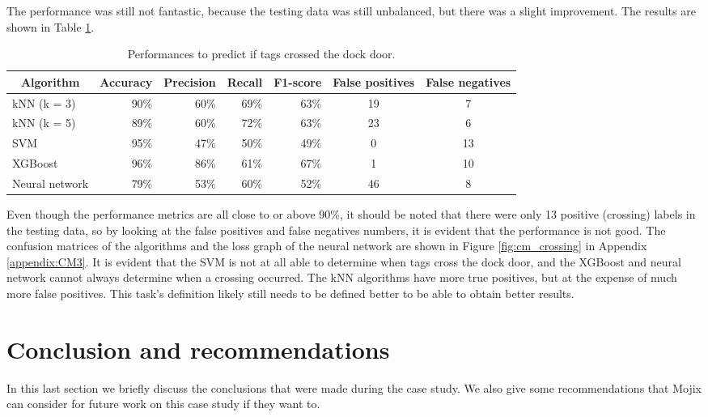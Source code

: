 \documentclass{article}
\begin{document}
The performance was still not fantastic, because the testing data was still unbalanced, but there was a slight improvement.
The results are shown in Table \ref{tab:crossing_clas}.
%
\begin{table}[h!]
\centering
\setlength{\belowcaptionskip}{7pt}
\caption{Performances to predict if tags crossed the dock door.}
\label{tab:crossing_clas}
\begin{tabular}{@{}lrrrrcc@{}}
\toprule
\multicolumn{1}{c}{\textbf{Algorithm}} & \multicolumn{1}{c}{\textbf{Accuracy}} & \multicolumn{1}{c}{\textbf{Precision}} & \multicolumn{1}{c}{\textbf{Recall}} & \multicolumn{1}{c}{\textbf{F1-score}} & \multicolumn{1}{c}{\textbf{False positives}} & \multicolumn{1}{c}{\textbf{False negatives}}\\ \midrule
kNN (k = 3)    & 90\%   & 60\%   & 69\%   & 63\%  &  19  &  7  \\
kNN (k = 5)    & 89\%   & 60\%   & 72\%   & 63\%  &  23  &  6  \\
SVM            & 95\%   & 47\%   & 50\%   & 49\%  &  0  &  13  \\
XGBoost        & 96\%   & 86\%   & 61\%   & 67\%  &  1  &  10  \\
Neural network & 79\%   & 53\%   & 60\%   & 52\%  &  46  &  8  \\ \bottomrule
\end{tabular}
\end{table}
%
Even though the performance metrics are all close to or above 90\%, it should be noted that there were only 13 positive (crossing) labels in the testing data, so by looking at the false positives and false negatives numbers, it is evident that the performance is not good.
The confusion matrices of the algorithms and the loss graph of the neural network are shown in Figure \ref{fig:cm_crossing} in Appendix \ref{appendix:CM3}.
It is evident that the \ac{SVM} is not at all able to determine when tags cross the dock door, and the XGBoost and neural network cannot always determine when a crossing occurred.
The \ac{kNN} algorithms have more true positives, but at the expense of much more false positives.
This task's definition likely still needs to be defined better to be able to obtain better results.

\section{Conclusion and recommendations}

In this last section we briefly discuss the conclusions that were made during the case study.
We also give some recommendations that Mojix can consider for future work on this case study if they want to.
\end{document}
